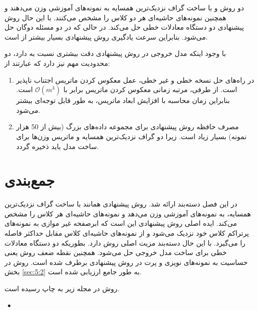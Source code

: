 دو روش  و  با ساخت گراف نزدیک‌ترین همسایه به نمونه‌های آموزشی وزن می‌دهند و همچنین نمونه‌های حاشیه‌ای هر دو کلاس را مشخص می‌کنند. با این حال روش پیشنهادی دو دستگاه معادلات خطی حل می‌کند. در حالی که در  دو مسئله دوگان حل می‌شود. بنابراین سرعت یادگیری روش پیشنهادی بسیار بیشتر از  است.

با وجود اینکه مدل خروجی در روش پیشنهادی دقت بیشتری نسبت به  دارد، دو محدودیت مهم نیز دارد که عبارتند از:
\begin{enumerate}
	\item در راه‌های حل نسخه خطی و غیر خطی، عمل معکوس کردن ماتریس اجتناب ناپذیر است. از طرفی، مرتبه زمانی معکوس کردن ماتریس برابر با  $\mathcal{O}({{m}^{3}})$ است. بنابراین زمان محاسبه با افزایش ابعاد ماتریس، به طور قابل توجه‌ای بیشتر می‌شود.
	\item مصرف حافظه روش پیشنهادی برای مجموعه داده‌های بزرگ (بیش از 50 هزار نمونه) بسیار زیاد است. زیرا دو گراف نزدیک‌ترین همسایه و ماتریس وزن‌ها برای ساخت مدل باید ذخیره گردد.
\end{enumerate}

\section{جمع‌بندی}\label{sec:3:5}
در این فصل دسته‌بند  ارائه شد. روش پیشنهادی همانند  با ساخت گراف نزدیک‌ترین همسایه، به نمونه‌های آموزشی وزن می‌دهد و نمونه‌های حاشیه‌ای هر کلاس را مشخص می‌کند. ایده اصلی روش پیشنهادی این است که ابرصفحه غیر موازی به نمونه‌های پرتراکم کلاس خود نزدیک می‌شود و از نمونه‌های حاشیه‌ای کلاس مقابل حداکثر فاصله را می‌گیرد. با این حال دسته‌بند  مزیت اصلی روش  دارد. بطوریکه دو دستگاه معادلات خطی برای ساخت مدل خروجی حل می‌شود. همچنین نقطه ضعف روش  یعنی حساسیت به نمونه‌های نویزی و پرت در روش پیشنهادی برطرف شده است. روش  در بخش \ref{sec:5:2} به طور جامع ارزیابی شده است.

روش  در مجله زیر به چاپ رسیده است.
\begin{LTR}
\begin{itemize}[label=$\bullet$]
	\item {}
\end{itemize}
\end{LTR}
